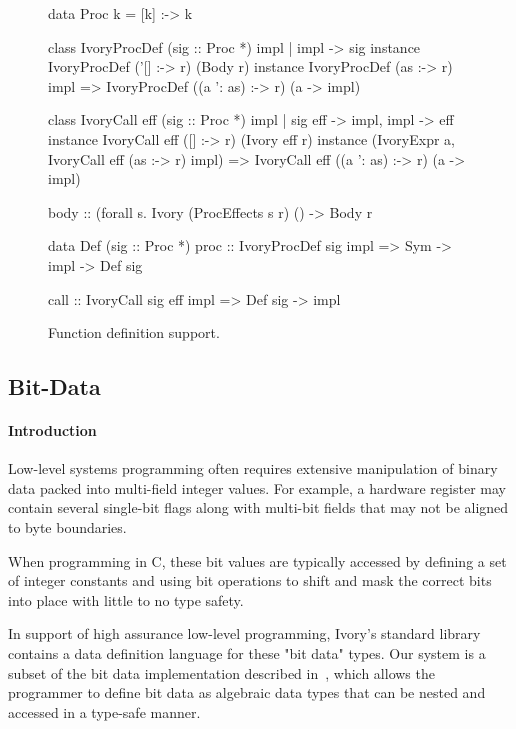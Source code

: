 \begin{figure}[ht]
\begin{code}
data Proc k = [k] :-> k

class IvoryProcDef (sig :: Proc *) impl | impl -> sig
instance IvoryProcDef ('[] :-> r) (Body r)
instance IvoryProcDef (as :-> r) impl
  => IvoryProcDef ((a ': as) :-> r) (a -> impl)

class IvoryCall eff (sig :: Proc *) impl
  | sig eff -> impl, impl -> eff
instance IvoryCall eff ([] :-> r) (Ivory eff r)
instance (IvoryExpr a, IvoryCall eff (as :-> r) impl)
  => IvoryCall eff ((a ': as) :-> r) (a -> impl)

body :: (forall s. Ivory (ProcEffects s r) () -> Body r

data Def (sig :: Proc *)
proc :: IvoryProcDef sig impl
     => Sym -> impl -> Def sig

call :: IvoryCall sig eff impl => Def sig -> impl
\end{code}
\caption{Function definition support.}
\label{fig:proc-defs}
\end{figure}


\subsection{Bit-Data}
\label{sec:bitdata}

\paragraph{Introduction}
Low-level systems programming often requires extensive manipulation
of binary data packed into multi-field integer values. For example,
a hardware register may contain several single-bit flags along with
multi-bit fields that may not be aligned to byte boundaries.

When programming in C, these bit values are typically accessed by
defining a set of integer constants and using bit operations to
shift and mask the correct bits into place with little to no type
safety.

In support of high assurance low-level programming, Ivory's standard
library contains a data definition language for these "bit data"
types. Our system is a subset of the bit data implementation
described in~\cite{high-level},
which allows the programmer to define bit data as algebraic data
types that can be nested and accessed in a type-safe manner.

